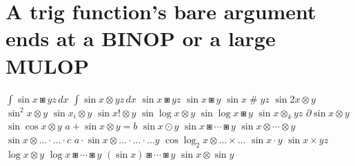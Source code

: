 \documentclass{article}
\begin{document}
\section{A trig function's bare argument ends at a BINOP or a large MULOP}
$\int\sin x\boxast y z\,dx$ $\int\sin x\otimes y z\,dx$ $\sin x\boxast y z$ $\sin x\boxast y$ $\sin x\mathbin{\#} y z$ $\sin 2x\otimes y$
$\sin^2 x\otimes y$ $\sin x_i\otimes y$ $\sin x!\otimes y$ $\sin\log x\otimes y$ $\sin\log x\boxast y$ $\sin x\otimes_k y z$
$\partial\sin x\otimes y$ $\sin\cos x\otimes y$ $a+\sin x\otimes y=b$ $\sin x\odot y$ $\sin x\boxast\cdots\boxast y$ $\sin x\otimes\cdots\otimes y$
$\sin x\otimes\ldots\cdot\ldots\cdot c$ $a\cdot\sin x\otimes\ldots\cdot\ldots\cdot\ldots y$ $\cos\log_2 x\otimes\ldots\times\ldots$
$\sin x\cdot y$ $\sin x\times y z$ $\log x\otimes y$ $\log x\boxast\cdots\boxast y$ $(\sin x)\boxast\cdots\boxast y$ $\sin x\otimes\sin y$
\end{document}

